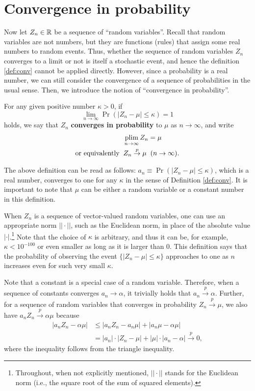 \documentclass[11pt, A4paper, openany, uplatex]{book}
\begin{document}
\section{Convergence in probability}\label{subsec:inprob}

Now let $Z_n \in \mathbb{R}$ be a  sequence of ``random variables''.
Recall that random variables are not numbers, but they are functions (rules) that assign some real numbers to random events.
Thus, whether the sequence of random variables $Z_n$ converges to a limit or not is itself a stochastic event, and hence the definition \ref{def:conv} cannot be applied directly.
However, since a probability is a real number, we can still consider the convergence of a sequence of probabilities in the usual sense.
Then, we introduce the notion of ``convergence in probability''.

\begin{definition}
For any given positive number $\kappa > 0$, if
\[
	\lim_{n \to \infty} \Pr(|Z_n - \mu| \le \kappa) = 1
\]
holds, we say that $Z_n$ \textbf{converges in probability} to $\mu$ as $n \to \infty$, and write 
\begin{align*}
	& \operatorname*{plim}_{n \to \infty} Z_n = \mu \\
	\text{or equivalently} \;\; &  Z_n \overset{p}{\to} \mu \;\; (n\to\infty).
\end{align*}
\end{definition}

The above definition can be read as follows: $a_n \equiv \Pr(|Z_n - \mu| \le \kappa)$, which is a real number, converges to one for any $\kappa$ in the sense of Definition \ref{def:conv}.
It is important to note that $\mu$ can be either a random variable or a constant number in this definition.

When $Z_n$ is a sequence of vector-valued random variables, one can use an appropriate norm $||\cdot||$, such as the Euclidean norm, in place of the absolute value $|\cdot|$.\footnote{
	Throughout, when not explicitly mentioned, $||\cdot||$ stands for the Euclidean norm (i.e., the square root of the sum of squared elements).
}
Note that the choice of $\kappa$ is arbitrary, and thus it can be, for example, $\kappa < 10^{-100}$ or even smaller as long as it is larger than 0.
This definition says that the probability of observing the event $\{|Z_n - \mu| \le \kappa\}$ approaches to one as $n$ increases even for such very small $\kappa$. 

Note that a constant is a special case of a random variable.
Therefore, when a sequence of constants converges $a_n \to \alpha$, it trivially holds that $a_n \overset{p}{\to} \alpha$.
Further, for a sequence of random variables that converges in probability $Z_n \overset{p}{\to} \mu$, we also have $a_n Z_n  \overset{p}{\to} \alpha \mu $ because
\begin{align*}
	|a_n Z_n - \alpha \mu| 
	& \le |a_n Z_n - a_n \mu| + |a_n \mu - \alpha \mu|\\
	& = |a_n| \cdot |Z_n - \mu| + |\mu| \cdot |a_n - \alpha| \overset{p}{\to} 0,
\end{align*}
where the inequality follows from the triangle inequality.
\end{document}
